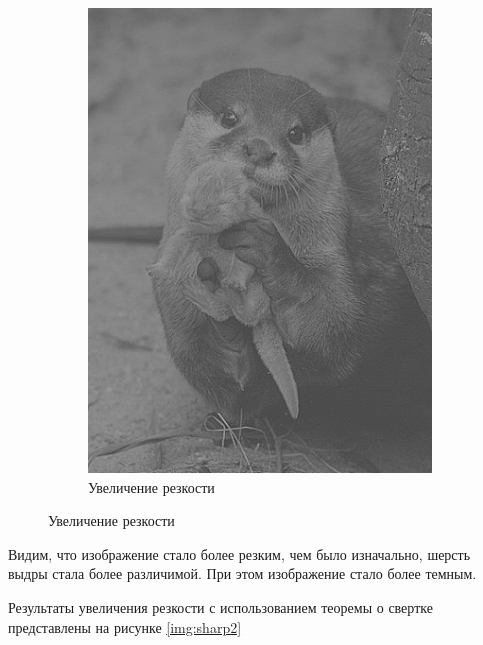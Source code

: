 \begin{figure}[ht!]
\begin{subfigure}[b]{0.5\linewidth}
        \includegraphics[width=0.95\linewidth]{laplacian.png}
        \caption{Увеличение резкости}
    \end{subfigure}
    \caption{Увеличение резкости}
    \label{img:sharp}
\end{figure}

Видим, что изображение стало более резким, чем было изначально, шерсть выдры стала более различимой. При этом изображение стало более темным. 

Результаты увеличения резкости с использованием теоремы о свертке представлены на рисунке \ref{img:sharp2}

